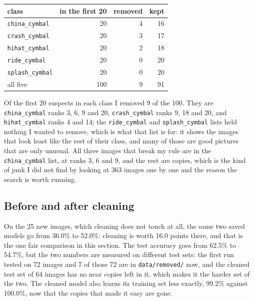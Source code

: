 \documentclass[11pt]{article}
\begin{document}
\begin{center}\footnotesize
\begin{tabular}{lrrr}
\toprule
class & in the first 20 & removed & kept \\
\midrule
\texttt{china\_cymbal}  & 20 & 4 & 16 \\
\texttt{crash\_cymbal}  & 20 & 3 & 17 \\
\texttt{hihat\_cymbal}  & 20 & 2 & 18 \\
\texttt{ride\_cymbal}   & 20 & 0 & 20 \\
\texttt{splash\_cymbal} & 20 & 0 & 20 \\
\midrule
all five                & 100 & 9 & 91 \\
\bottomrule
\end{tabular}
\end{center}

Of the first 20 suspects in each class I removed 9 of the 100. They are
\texttt{china\_cymbal} ranks 3, 6, 9 and 20, \texttt{crash\_cymbal} ranks 9, 18
and 20, and \texttt{hihat\_cymbal} ranks 4 and 14; the \texttt{ride\_cymbal} and
\texttt{splash\_cymbal} lists held nothing I wanted to remove, which is what
that list is for: it shows the images that look least like the rest of their
class, and many of those are good pictures that are only unusual. All three
images that break my rule are in the \texttt{china\_cymbal} list, at ranks 3, 6
and 9, and the rest are copies, which is the kind of junk I did not find by
looking at 363 images one by one and the reason the search is worth running.

\subsection*{Before and after cleaning}

On the 25 new images, which cleaning does not touch at all, the same two saved
models go from 36.0\% to 52.0\%: cleaning is worth 16.0 points there, and that is
the one fair comparison in this section. The test accuracy goes from 62.5\% to
54.7\%, but the two numbers are measured on different test sets: the first run
tested on 72 images and 7 of those 72 are in \texttt{data/removed/} now, and the
cleaned test set of 64 images has no near copies left in it, which makes it the
harder set of the two. The cleaned model also learns its training set less
exactly, 99.2\% against 100.0\%, now that the copies that made it easy are gone.

\end{document}
